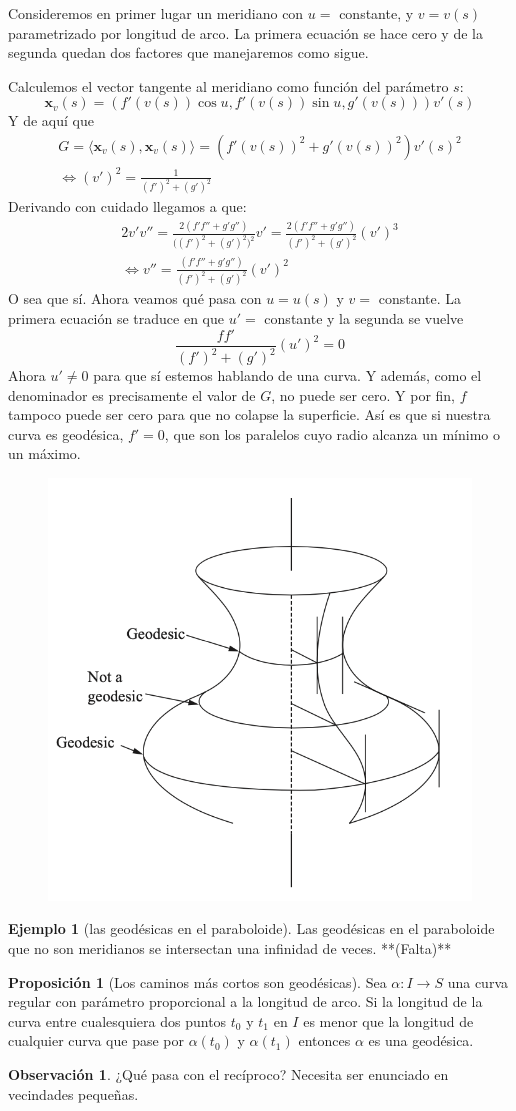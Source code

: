 \documentclass[spanish]{book}
\theoremstyle{definition}
\newtheorem*{prop}{Proposición}
\newtheorem*{obs}{Observación}
\newtheorem*{ejem}{Ejemplo}
\begin{document}
Consideremos en primer lugar un meridiano con $u=$ constante, y $v=v(s)$ parametrizado por longitud de arco. La primera ecuación se hace cero y de la segunda quedan dos factores que manejaremos como sigue.

Calculemos el vector tangente al meridiano como función del parámetro $s$:
\[\mathbf x_v(s)= \left(f'(v(s))\cos u,f'(v(s))\sin u,g'(v(s))\right)v'(s)\]
Y de aquí que
\begin{align*}
	G=\langle\mathbf{x}_v(s),\mathbf x_v(s)\rangle= \left(f'(v(s))^2+g'(v(s))^2\right)v'(s)^2\\
	\iff (v')^2=\frac{1}{(f')^2+(g')^2}
\end{align*}
Derivando con cuidado llegamos a que:
\begin{align*}
	2v'v''=\frac{2(f'f''+g'g'')}{\big((f')^2+(g')^2\big)^2}v'=\frac{2(f'f''+g'g'')}{(f')^2+(g')^2}(v')^3\\
	\iff v''=\frac{(f'f''+g'g'')}{(f')^2+(g')^2}(v')^2
\end{align*}
O sea que sí. Ahora veamos qué pasa con $u=u(s)$ y $v=$ constante. La primera ecuación se traduce en que $u'=$ constante y la segunda se vuelve
\[\frac{ff'}{(f')^2+(g')^2}(u')^2=0\]
Ahora $u'\neq0$ para que sí estemos hablando de una curva. Y además, como el denominador es precisamente el valor de $G$, no puede ser cero. Y por fin, $f$ tampoco puede ser cero para que no colapse la superficie. Así es que si nuestra curva es geodésica, $f'=0$, que son los paralelos cuyo radio alcanza un mínimo o un máximo.
\begin{figure}
	\centering
	\includegraphics[width=0.6\linewidth]{gauss13}
\end{figure}
\begin{ejem}[las geodésicas en el paraboloide]
	Las geodésicas en el paraboloide que no son meridianos se intersectan una infinidad de veces. **(Falta)**
\end{ejem}
\begin{prop}[Los caminos más cortos son geodésicas]
	Sea $\alpha: I\to S$ una curva regular con parámetro proporcional a la longitud de arco. Si la longitud de la curva entre cualesquiera dos puntos $t_0$ y $t_1$ en $I$ es menor que la longitud de cualquier curva que pase por $\alpha(t_0)$ y $\alpha(t_1)$ entonces $\alpha$ es una geodésica.
\end{prop}
\begin{obs}
	¿Qué pasa con el recíproco? Necesita ser enunciado en vecindades pequeñas.
\end{obs}
\end{document}
